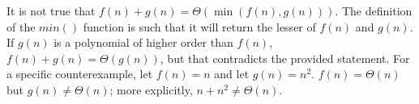 It is not true that $ f(n) + g(n) = \Theta( \min( f(n), g(n) ) ) $. The definition of the $ min() $ function is such that it will return the lesser of $ f(n) $ and $ g(n) $. If $ g(n) $ is a polynomial of higher order than $ f(n) $, $ f(n) + g(n) = \Theta( g(n) ) $, but that contradicts the provided statement. For a specific counterexample, let $ f(n) = n $ and let $ g(n) = n^2 $. $ f(n) = \Theta(n) $ but $ g(n) \neq \Theta(n) $; more explicitly, $ n + n^2 \neq \Theta(n) $.